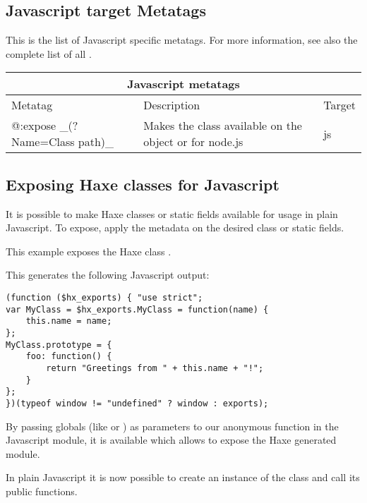 \subsection{Javascript target Metatags}
\label{target-javascript-metatags}

This is the list of Javascript specific metatags. For more information, see also the complete list of all .

\begin{center}
\begin{tabular}{| l | l | l |}
	\hline
	\multicolumn{3}{|c|}{Javascript metatags} \\ \hline
	Metatag &  Description & Target \\ \hline
	@:expose \_(?Name=Class path)\_  &  Makes the class available on the \expr{window} object or \expr{exports} for node.js  & js  \\
\end{tabular}
\end{center}

\subsection{Exposing Haxe classes for Javascript}
\label{target-javascript-expose}

It is possible to make Haxe classes or static fields available for usage in plain Javascript. 
To expose, apply the  metadata on the desired class or static fields.

This example exposes the Haxe class .


This generates the following Javascript output:

\begin{lstlisting}
(function ($hx_exports) { "use strict";
var MyClass = $hx_exports.MyClass = function(name) {
	this.name = name;
};
MyClass.prototype = {
	foo: function() {
		return "Greetings from " + this.name + "!";
	}
};
})(typeof window != "undefined" ? window : exports);
\end{lstlisting}

By passing globals (like  or ) as parameters to our anonymous function in the Javascript module, it is available which allows to expose the Haxe generated module.

In plain Javascript it is now possible to create an instance of the class and call its public functions.

